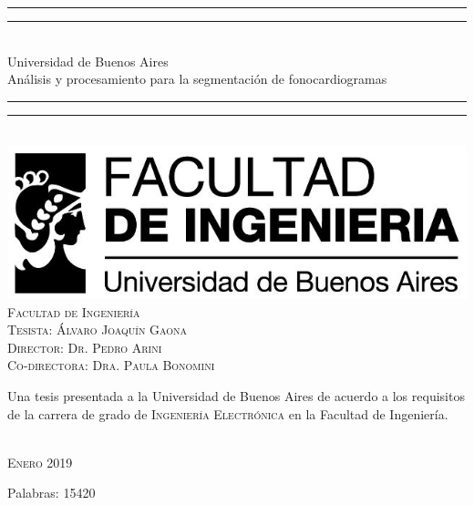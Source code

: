\begin{titlepage}
  \vspace*{5mm}
  \begin{center}
  \rule[0.5ex]{\linewidth}{2pt}\vspace*{-\baselineskip}\vspace*{3.2pt}
  \rule[0.5ex]{\linewidth}{1pt}\\[\baselineskip]
  {\Huge Universidad de Buenos Aires }\\[4mm]
  {\Large Análisis y procesamiento para la segmentación de fonocardiogramas}\\
  \rule[0.5ex]{\linewidth}{1pt}\vspace*{-\baselineskip}\vspace{3.2pt}
  \rule[0.5ex]{\linewidth}{2pt}\\
  \vspace{6.5mm}
  \includegraphics[scale=0.4]{sections/logo-facu-caratula.jpg}\\
  \vspace{6mm}
  {\large %
  \textsc{Facultad de Ingeniería}}\\
  \vspace{6.5mm}
  {\large\textsc{Tesista: Álvaro Joaquín Gaona}}\\
  {\large\textsc{Director: Dr. Pedro Arini}}\\
  {\large\textsc{Co-directora: Dra. Paula Bonomini}}\\
  \vspace{11mm}
  \begin{minipage}{14.1cm}
  Una tesis presentada a la Universidad de Buenos Aires de acuerdo a los requisitos de la carrera de grado de \textsc{Ingeniería} \textsc{Electrónica} en la Facultad de Ingeniería.
  \end{minipage}\\
  \vspace{9mm}
  {\large\textsc{Enero 2019}}
  \vspace{12mm}
  \end{center}
  \begin{flushright}
  {\small Palabras: 15420}
  \end{flushright}
\end{titlepage}
